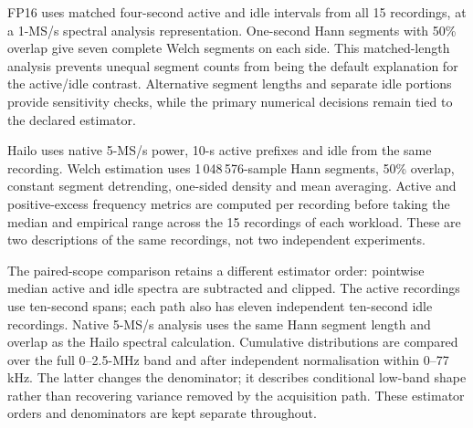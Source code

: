FP16 uses matched four-second active and idle intervals from all 15 recordings, at a 1-MS/s spectral analysis representation. One-second Hann segments with 50\% overlap give seven complete Welch segments on each side. This matched-length analysis prevents unequal segment counts from being the default explanation for the active/idle contrast. Alternative segment lengths and separate idle portions provide sensitivity checks, while the primary numerical decisions remain tied to the declared estimator.

Hailo uses native 5-MS/s power, 10-s active prefixes and idle from the same recording. Welch estimation uses 1\,048\,576-sample Hann segments, 50\% overlap, constant segment detrending, one-sided density and mean averaging. Active and positive-excess frequency metrics are computed per recording before taking the median and empirical range across the 15 recordings of each workload. These are two descriptions of the same recordings, not two independent experiments.

The paired-scope comparison retains a different estimator order: pointwise median active and idle spectra are subtracted and clipped. The active recordings use ten-second spans; each path also has eleven independent ten-second idle recordings. Native 5-MS/s analysis uses the same Hann segment length and overlap as the Hailo spectral calculation. Cumulative distributions are compared over the full 0--2.5-MHz band and after independent normalisation within 0--77 kHz. The latter changes the denominator; it describes conditional low-band shape rather than recovering variance removed by the acquisition path. These estimator orders and denominators are kept separate throughout.
